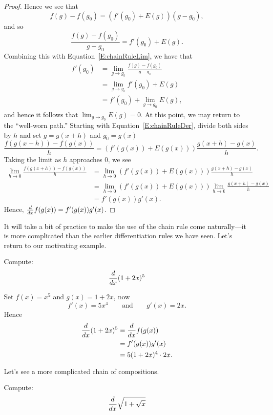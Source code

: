 \begin{proof}
Hence we see that
\begin{equation}\label{E:chainRuleDer}
f(g)-f(g_0) = \left(f'(g_0) + E(g)\right)(g-g_0),
\end{equation}
and so
\[
\frac{f(g)-f(g_0)}{g-g_0} = f'(g_0) + E(g).
\]
Combining this with Equation~\ref{E:chainRuleLim}, we have that
\begin{align*}
f'(g_0) &= \lim_{g\to g_0}\frac{f(g)-f(g_0)}{g-g_0} \\
&= \lim_{g\to g_0}f'(g_0) + E(g)\\
&= f'(g_0) + \lim_{g\to g_0} E(g),
\end{align*}
and hence it follows that $\lim_{g\to g_0} E(g) = 0$. At this point,
we may return to the ``well-worn path.'' Starting with
Equation~\ref{E:chainRuleDer}, divide both sides by $h$ and set
$g=g(x+h)$ and $g_0=g(x)$
\[
\frac{f(g(x+h))-f(g(x))}{h} = \left(f'(g(x)) +
E(g(x))\right)\frac{g(x+h)-g(x)}{h}.
\]
Taking the limit as $h$ approaches $0$, we see 
\begin{align*}
\lim_{h\to 0}\frac{f(g(x+h))-f(g(x))}{h} &= \lim_{h\to 0}\left(f'(g(x))
+ E(g(x))\right)\frac{g(x+h)-g(x)}{h}\\
&= \lim_{h\to 0}\left(f'(g(x))
+ E(g(x))\right)\lim_{h\to 0}\frac{g(x+h)-g(x)}{h}\\
&= f'(g(x))g'(x).
\end{align*}
Hence, $\frac{d}{dx} f(g(x))= f'(g(x))g'(x)$.
\end{proof}


It will take a bit of practice to make the use of the chain rule come
naturally---it is more complicated than the earlier differentiation
rules we have seen. Let's return to our motivating example.

\begin{example}
Compute:
\[
\frac{d}{dx} (1+2x)^5
\]
\end{example}

\begin{solution}
Set $f(x) = x^5$ and $g(x) = 1+2x$, now
\[
f'(x) = 5x^4 \qquad\text{and}\qquad g'(x) = 2x.
\]
Hence
\begin{align*}
\frac{d}{dx} (1+2x)^5 &= \frac{d}{dx} f(g(x))\\ 
&=f'(g(x))g'(x) \\
&= 5(1+2x)^4\cdot 2x.
\end{align*}
\end{solution}


Let's see a more complicated chain of compositions.

\begin{example}
Compute:
\[
\frac{d}{dx} \sqrt{1+\sqrt{x}}
\]
\end{example}

